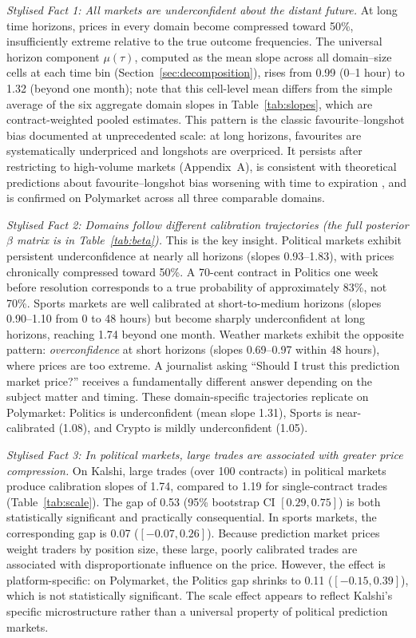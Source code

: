 \documentclass[numsec,webpdf,modern,medium]{oup-authoring-template}
\theoremstyle{thmstyleone}%
\theoremstyle{thmstyletwo}%
\theoremstyle{thmstylethree}%
\begin{document}
\emph{Stylised Fact 1: All markets are underconfident about the distant future.} At long time horizons, prices in every domain become compressed toward 50\%, insufficiently extreme relative to the true outcome frequencies. The universal horizon component $\mu(\tau)$, computed as the mean slope across all domain--size cells at each time bin (Section~\ref{sec:decomposition}), rises from 0.99 (0--1 hour) to 1.32 (beyond one month); note that this cell-level mean differs from the simple average of the six aggregate domain slopes in Table~\ref{tab:slopes}, which are contract-weighted pooled estimates. This pattern is the classic favourite--longshot bias \citep{griffith1949odds,thaler1988anomalies,shin1991optimal,snowberg2010explaining} documented at unprecedented scale: at long horizons, favourites are systematically underpriced and longshots are overpriced. It persists after restricting to high-volume markets (Appendix~A), is consistent with theoretical predictions about favourite--longshot bias worsening with time to expiration \citep{page2013prediction}, and is confirmed on Polymarket across all three comparable domains.

\emph{Stylised Fact 2: Domains follow different calibration trajectories (the full posterior $\beta$ matrix is in Table~\ref{tab:beta}).} This is the key insight. Political markets exhibit persistent underconfidence at nearly all horizons (slopes 0.93--1.83), with prices chronically compressed toward 50\%. A 70-cent contract in Politics one week before resolution corresponds to a true probability of approximately 83\%, not 70\%. Sports markets are well calibrated at short-to-medium horizons (slopes 0.90--1.10 from 0 to 48 hours) but become sharply underconfident at long horizons, reaching 1.74 beyond one month. Weather markets exhibit the opposite pattern: \emph{overconfidence} at short horizons (slopes 0.69--0.97 within 48 hours), where prices are too extreme. A journalist asking ``Should I trust this prediction market price?'' receives a fundamentally different answer depending on the subject matter and timing. These domain-specific trajectories replicate on Polymarket: Politics is underconfident (mean slope 1.31), Sports is near-calibrated (1.08), and Crypto is mildly underconfident (1.05).

\emph{Stylised Fact 3: In political markets, large trades are associated with greater price compression.} On Kalshi, large trades (over 100 contracts) in political markets produce calibration slopes of 1.74, compared to 1.19 for single-contract trades (Table~\ref{tab:scale}). The gap of 0.53 (95\% bootstrap CI $[0.29, 0.75]$) is both statistically significant and practically consequential. In sports markets, the corresponding gap is 0.07 ($[-0.07, 0.26]$). Because prediction market prices weight traders by position size, these large, poorly calibrated trades are associated with disproportionate influence on the price. However, the effect is platform-specific: on Polymarket, the Politics gap shrinks to 0.11 ($[-0.15, 0.39]$), which is not statistically significant. The scale effect appears to reflect Kalshi's specific microstructure rather than a universal property of political prediction markets.
\end{document}
